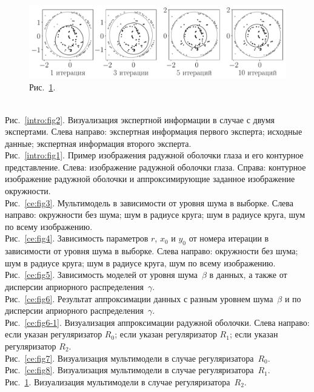 \documentclass[12pt]{a&t}
\begin{document}
{\begin{figure}[h!]
\begin{center}
     \includegraphics[width=\textwidth]{experiment_real_regular}
\end{center}
     \caption{Рис.~\ref{ce:fig9}.}
    \label{ce:fig9}
\end{figure}
}

\clearpage
~\\
Рис.~\ref{intro:fig2}. Визуализация экспертной информации в случае с двумя экспертами. Слева направо: экспертная информация первого эксперта; исходные данные; экспертная информация второго эксперта.
~\\
Рис.~\ref{intro:fig1}. Пример изображения радужной оболочки глаза и его контурное представление. Слева: изображение радужной оболочки глаза. Справа: контурное изображение радужной оболочки и аппроксимирующие заданное изображение окружности.
~\\
Рис.~\ref{ce:fig3}. Мультимодель в зависимости от уровня шума в выборке. Слева направо: окружности без шума; шум в радиусе круга; шум в радиусе круга, шум по всему изображению.
~\\
Рис.~\ref{ce:fig4}. Зависимость параметров $r$, $x_0$ и $y_0$ от номера итерации в зависимости от уровня шума в выборке. Слева направо: окружности без шума; шум в радиусе круга; шум в радиусе круга, шум по всему изображению.
~\\
Рис.~\ref{ce:fig5}. Зависимость моделей от уровня шума~$\beta$ в данных, а также от дисперсии априорного распределения~$\gamma$.
~\\
Рис.~\ref{ce:fig6}. Результат аппроксимации данных с разным уровнем шума~$\beta$ и по дисперсии априорного распределения~$\gamma$.
~\\
Рис.~\ref{ce:fig6-1}. Визуализация аппроксимации радужной оболочки. Слева направо: если указан регуляризатор $R_0$; если указан регуляризатор $R_1$; если указан регуляризатор $R_2$.
~\\
Рис.~\ref{ce:fig7}. Визуализация мультимодели в случае регуляризатора~$R_0$.
~\\
Рис.~\ref{ce:fig8}. Визуализация мультимодели в случае регуляризатора~$R_1$.
~\\
Рис.~\ref{ce:fig9}. Визуализация мультимодели в случае регуляризатора~$R_2$.
\end{document}
